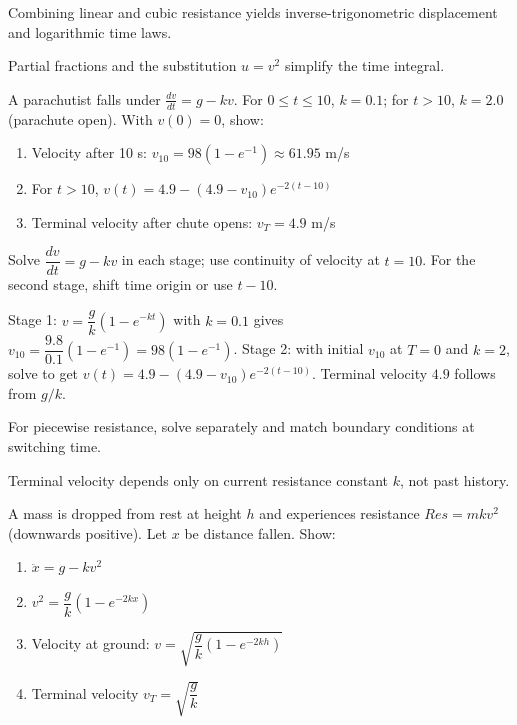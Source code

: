 \begin{takeaways}
\item Combining linear and cubic resistance yields inverse-trigonometric displacement and logarithmic time laws.
\item Partial fractions and the substitution $u=v^2$ simplify the time integral.
\end{takeaways}

\begin{problem}
A parachutist falls under $\frac{dv}{dt}=g-kv$. For $0\le t\le10$, $k=0.1$; for $t>10$, $k=2.0$ (parachute open). With $v(0)=0$, show:
\begin{enumerate}[label=\textbf{\alph*.}]
    \item Velocity after 10 s: $v_{10}=98(1-e^{-1})\approx61.95$ m/s
    \item For $t>10$, $v(t)=4.9-(4.9-v_{10})e^{-2(t-10)}$
    \item Terminal velocity after chute opens: $v_T=4.9$ m/s
\end{enumerate}
\end{problem}

\begin{hint}
Solve $\dfrac{dv}{dt}=g-kv$ in each stage; use continuity of velocity at $t=10$. For the second stage, shift time origin or use $t-10$.
\end{hint}

\begin{solution}
Stage 1: $v=\dfrac{g}{k}(1-e^{-kt})$ with $k=0.1$ gives $v_{10}=\dfrac{9.8}{0.1}(1-e^{-1})=98(1-e^{-1})$. Stage 2: with initial $v_{10}$ at $T=0$ and $k=2$, solve to get $v(t)=4.9-(4.9-v_{10})e^{-2(t-10)}$. Terminal velocity $4.9$ follows from $g/k$.
\end{solution}

\begin{takeaways}
\item For piecewise resistance, solve separately and match boundary conditions at switching time.
\item Terminal velocity depends only on current resistance constant $k$, not past history.
\end{takeaways}

\begin{problem}
A mass is dropped from rest at height $h$ and experiences resistance $Res = mkv^2$ (downwards positive). Let $x$ be distance fallen. Show:
\begin{enumerate}[label=\textbf{\alph*.}]
    \item $\ddot{x}=g-kv^2$
    \item $v^2=\dfrac{g}{k}(1-e^{-2kx})$
    \item Velocity at ground: $v=\sqrt{\dfrac{g}{k}\left(1-e^{-2kh}\right)}$
    \item Terminal velocity $v_T=\sqrt{\dfrac{g}{k}}$
\end{enumerate}
\end{problem}


